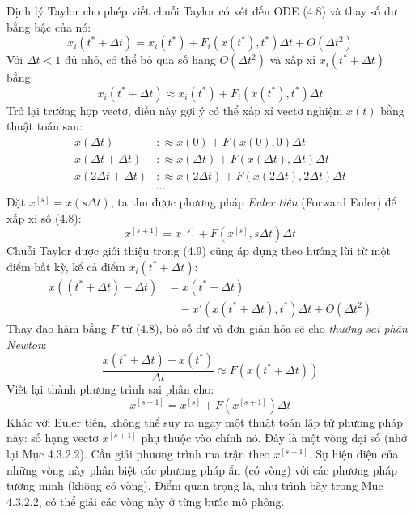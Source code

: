 Định lý Taylor cho phép viết chuỗi Taylor có xét đến ODE (4.8) và thay số dư bằng bậc của nó:
\begin{equation}x_i(t^*+\Delta t)=x_i(t^*)+F_i(x(t^*),t^*)\Delta t+O(\Delta t^2)\tag{4.10}\end{equation}
Với $\Delta t<1$ đủ nhỏ, có thể bỏ qua số hạng $O(\Delta t^2)$ và xấp xỉ $x_i(t^*+\Delta t)$ bằng:
\begin{equation}x_i(t^*+\Delta t)\approx x_i(t^*)+F_i(x(t^*),t^*)\Delta t\tag{4.11}\end{equation}
Trở lại trường hợp vectơ, điều này gợi ý có thể xấp xỉ vectơ nghiệm $x(t)$ bằng thuật toán sau:
\begin{equation}\begin{aligned}
x(\Delta t)&:\approx x(0)+F(x(0),0)\Delta t\\
x(\Delta t+\Delta t)&:\approx x(\Delta t)+F(x(\Delta t),\Delta t)\Delta t\\
x(2\Delta t+\Delta t)&:\approx x(2\Delta t)+F(x(2\Delta t),2\Delta t)\Delta t\\
&\cdots
\end{aligned}\tag{4.12}\end{equation}
Đặt $x^{[s]}=x(s\Delta t)$, ta thu được phương pháp \emph{Euler tiến} (Forward Euler) để xấp xỉ số (4.8):
\begin{equation}x^{[s+1]}=x^{[s]}+F(x^{[s]},s\Delta t)\Delta t\tag{4.13}\end{equation}
Chuỗi Taylor được giới thiệu trong (4.9) cũng áp dụng theo hướng lùi từ một điểm bất kỳ, kể cả điểm $x_i(t^*+\Delta t)$:
\begin{equation}\begin{aligned}
x((t^*+\Delta t)-\Delta t)&=x(t^*+\Delta t)\\
&\quad-x'(x(t^*+\Delta t),t^*)\Delta t+O(\Delta t^2)
\end{aligned}\tag{4.14}\end{equation}
Thay đạo hàm bằng $F$ từ (4.8), bỏ số dư và đơn giản hóa sẽ cho \emph{thương sai phân Newton}:
\begin{equation}\frac{x(t^*+\Delta t)-x(t^*)}{\Delta t}\approx F(x(t^*+\Delta t))\tag{4.15}\end{equation}
Viết lại thành phương trình sai phân cho:
\begin{equation}x^{[s+1]}=x^{[s]}+F(x^{[s+1]})\Delta t\tag{4.16}\end{equation}
Khác với Euler tiến, không thể suy ra ngay một thuật toán lặp từ phương pháp này: số hạng vectơ $x^{[s+1]}$ phụ thuộc vào chính nó. Đây là một vòng đại số (nhớ lại Mục 4.3.2.2). Cần giải phương trình ma trận theo $x^{[s+1]}$. Sự hiện diện của những vòng này phân biệt các phương pháp ẩn (có vòng) với các phương pháp tường minh (không có vòng). Điểm quan trọng là, như trình bày trong Mục 4.3.2.2, có thể giải các vòng này ở từng bước mô phỏng.

